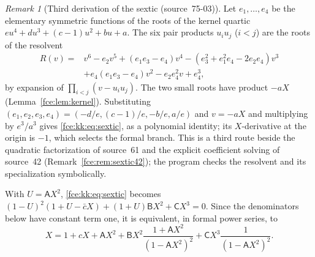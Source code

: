 \documentclass[11pt,a4paper]{article}
\numberwithin{equation}{section}
\theoremstyle{definition}\newtheorem{definition}[theorem]{Definition}
\theoremstyle{remark}\newtheorem{remark}[theorem]{Remark}
\begin{document}
\begin{remark}[Third derivation of the sextic (source~75-03)]\label{fce:kk:rem:resolvent}
Let $e_1,\ldots,e_4$ be the elementary symmetric functions of the roots of
the kernel quartic $eu^4+du^3+(c-1)u^2+bu+a$. The six pair products
$u_iu_j$ ($i<j$) are the roots of the resolvent
\begin{align*}
 R(v)={}&v^6-e_2v^5+(e_1e_3-e_4)v^4
 -(e_3^2+e_1^2e_4-2e_2e_4)v^3\\
 &+e_4(e_1e_3-e_4)v^2-e_2e_4^2v+e_4^3,
\end{align*}
by expansion of $\prod_{i<j}(v-u_iu_j)$. The two small roots have product
$-aX$ (Lemma~\ref{fce:lem:kernel}). Substituting
$(e_1,e_2,e_3,e_4)=(-d/e,(c-1)/e,-b/e,a/e)$ and $v=-aX$ and multiplying by
$e^3/a^3$ gives \eqref{fce:kk:eq:sextic}, as a polynomial identity; its
$X$-derivative at the origin is $-1$, which selects the formal branch. This
is a third route beside the quadratic factorization of source~61 and the
explicit coefficient solving of source~42
(Remark~\ref{fce:rem:sextic42}); the program
 checks the resolvent and its
specialization symbolically.
\end{remark}

With $U=\mathsf AX^2$, \eqref{fce:kk:eq:sextic} becomes
$(1-U)^2(1+U-\bar cX)+(1+U)\mathsf BX^2+\mathsf CX^3=0$. Since the
denominators below have constant term one, it is equivalent, in formal
power series, to
\begin{equation}\label{fce:kk:eq:implicit}
 X=1+cX+\mathsf AX^2+\mathsf BX^2\frac{1+\mathsf AX^2}{(1-\mathsf AX^2)^2}
 +\mathsf CX^3\frac1{(1-\mathsf AX^2)^2}.
\end{equation}
\end{document}
